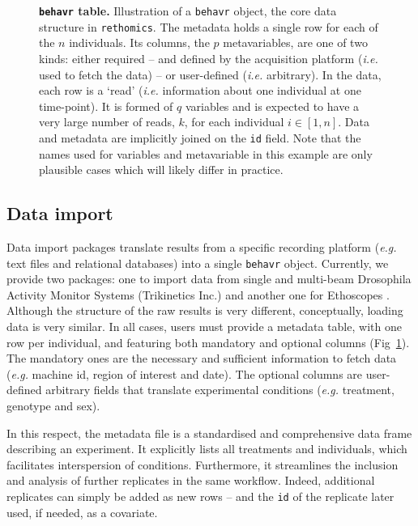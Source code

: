 \documentclass[10pt,letterpaper]{article}\usepackage[]{graphicx}\usepackage[]{color}
\begin{document}
\begin{figure}[!h]
	\caption{{\bf \texttt{behavr} table.}
	Illustration of a \texttt{behavr} object, the core data structure in \texttt{rethomics}.
		The metadata holds a single row for each of the $n$ individuals. 
		Its columns, the $p$ metavariables, are one of two kinds: either required -- and defined by the acquisition platform (\emph{i.e.} used to fetch the data) -- or user-defined (\emph{i.e.} arbitrary).
		In the data, each row is a `read' (\emph{i.e.} information about one individual at one time-point).
		It is formed of $q$ variables and is expected to have a very large number of reads, $k$, for each individual $i\in [1,n]$.
		Data and metadata are implicitly joined on the \texttt{id} field.
		Note that the names used for variables and metavariable in this example are only plausible cases which will likely differ in practice. 
	}
	\label{fig:fig-2}
\end{figure}

\subsection*{Data import}
Data import packages translate results from a specific recording platform (\emph{e.g.} text files and relational databases) into a single \texttt{behavr} object.
Currently, we provide two packages: one to import data from single and multi-beam Drosophila Activity Monitor Systems (Trikinetics Inc.) 
and another one for Ethoscopes \cite{geissmann_ethoscopes_2017}.
Although the structure of the raw results is very different, conceptually, loading data is very similar.
In all cases, users must provide a metadata table, with one row per individual,
and featuring both mandatory and optional columns (Fig~\ref{fig:fig-2}).
The mandatory ones are the necessary and sufficient information to fetch data (\emph{e.g.} machine id, region of interest and date). 
The optional columns are user-defined arbitrary fields that translate experimental conditions (\emph{e.g.} treatment, genotype and sex).

In this respect, the metadata file is a standardised and comprehensive data frame describing an experiment.
It explicitly lists all treatments and individuals, which facilitates interspersion of conditions.
Furthermore, it streamlines the inclusion and analysis of further replicates in the same workflow.
Indeed, additional replicates can simply be added as new rows -- and the \texttt{id} of the replicate later used, if needed, as a covariate.	
\end{document}
